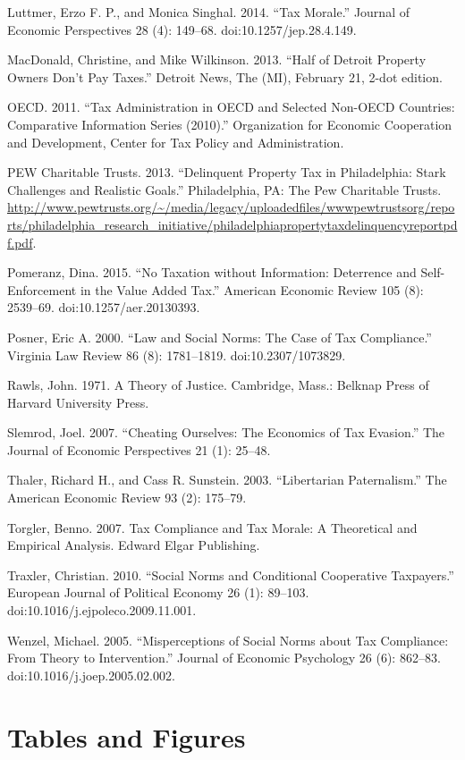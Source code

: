 \documentclass[12pt,titlepage]{article}
\begin{document}
Luttmer, Erzo F. P., and Monica Singhal. 2014. “Tax Morale.” Journal of Economic Perspectives 28 (4): 149–68. doi:10.1257/jep.28.4.149.

MacDonald, Christine, and Mike Wilkinson. 2013. “Half of Detroit Property Owners Don’t Pay Taxes.” Detroit News, The (MI), February 21, 2-dot edition.

OECD. 2011. “Tax Administration in OECD and Selected Non-OECD Countries: Comparative Information Series (2010).” Organization for Economic Cooperation and Development, Center for Tax Policy and Administration.

PEW Charitable Trusts. 2013. “Delinquent Property Tax in Philadelphia: Stark Challenges and Realistic Goals.” Philadelphia, PA: The Pew Charitable Trusts. \url{http://www.pewtrusts.org/~/media/legacy/uploadedfiles/wwwpewtrustsorg/reports/philadelphia_research_initiative/philadelphiapropertytaxdelinquencyreportpdf.pdf}.

Pomeranz, Dina. 2015. “No Taxation without Information: Deterrence and Self-Enforcement in the Value Added Tax.” American Economic Review 105 (8): 2539–69. doi:10.1257/aer.20130393.

Posner, Eric A. 2000. “Law and Social Norms: The Case of Tax Compliance.” Virginia Law Review 86 (8): 1781–1819. doi:10.2307/1073829.

Rawls, John. 1971. A Theory of Justice. Cambridge, Mass.: Belknap Press of Harvard University Press.

Slemrod, Joel. 2007. “Cheating Ourselves: The Economics of Tax Evasion.” The Journal of Economic Perspectives 21 (1): 25–48.

Thaler, Richard H., and Cass R. Sunstein. 2003. “Libertarian Paternalism.” The American Economic Review 93 (2): 175–79.

Torgler, Benno. 2007. Tax Compliance and Tax Morale: A Theoretical and Empirical Analysis. Edward Elgar Publishing.

Traxler, Christian. 2010. “Social Norms and Conditional Cooperative Taxpayers.” European Journal of Political Economy 26 (1): 89–103. doi:10.1016/j.ejpoleco.2009.11.001.

Wenzel, Michael. 2005. “Misperceptions of Social Norms about Tax Compliance: From Theory to Intervention.” Journal of Economic Psychology 26 (6): 862–83. doi:10.1016/j.joep.2005.02.002.

\section{Tables and Figures}
\end{document}
